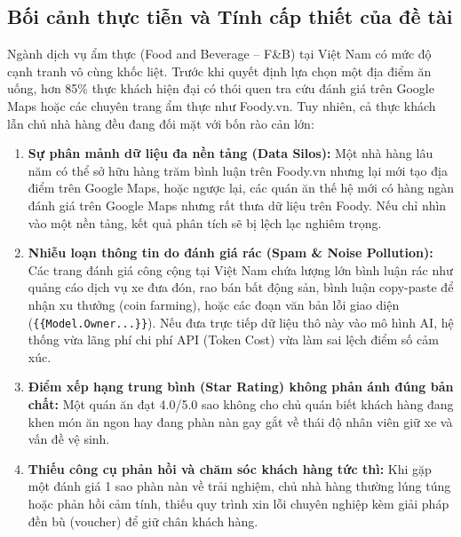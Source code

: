 \documentclass[12pt, a4paper]{article}
\begin{document}
\subsection{Bối cảnh thực tiễn và Tính cấp thiết của đề tài}
Ngành dịch vụ ẩm thực (Food and Beverage -- F\&B) tại Việt Nam có mức độ cạnh tranh vô cùng khốc liệt. Trước khi quyết định lựa chọn một địa điểm ăn uống, hơn 85\% thực khách hiện đại có thói quen tra cứu đánh giá trên Google Maps hoặc các chuyên trang ẩm thực như Foody.vn. Tuy nhiên, cả thực khách lẫn chủ nhà hàng đều đang đối mặt với bốn rào cản lớn:
\begin{enumerate}[leftmargin=1.2cm]
    \item \textbf{Sự phân mảnh dữ liệu đa nền tảng (Data Silos):} Một nhà hàng lâu năm có thể sở hữu hàng trăm bình luận trên Foody.vn nhưng lại mới tạo địa điểm trên Google Maps, hoặc ngược lại, các quán ăn thế hệ mới có hàng ngàn đánh giá trên Google Maps nhưng rất thưa dữ liệu trên Foody. Nếu chỉ nhìn vào một nền tảng, kết quả phân tích sẽ bị lệch lạc nghiêm trọng.
    \item \textbf{Nhiễu loạn thông tin do đánh giá rác (Spam \& Noise Pollution):} Các trang đánh giá công cộng tại Việt Nam chứa lượng lớn bình luận rác như quảng cáo dịch vụ xe đưa đón, rao bán bất động sản, bình luận copy-paste để nhận xu thưởng (coin farming), hoặc các đoạn văn bản lỗi giao diện (\texttt{\{\{Model.Owner...\}\}}). Nếu đưa trực tiếp dữ liệu thô này vào mô hình AI, hệ thống vừa lãng phí chi phí API (Token Cost) vừa làm sai lệch điểm số cảm xúc.
    \item \textbf{Điểm xếp hạng trung bình (Star Rating) không phản ánh đúng bản chất:} Một quán ăn đạt 4.0/5.0 sao không cho chủ quán biết khách hàng đang khen món ăn ngon hay đang phàn nàn gay gắt về thái độ nhân viên giữ xe và vấn đề vệ sinh.
    \item \textbf{Thiếu công cụ phản hồi và chăm sóc khách hàng tức thì:} Khi gặp một đánh giá 1 sao phàn nàn về trải nghiệm, chủ nhà hàng thường lúng túng hoặc phản hồi cảm tính, thiếu quy trình xin lỗi chuyên nghiệp kèm giải pháp đền bù (voucher) để giữ chân khách hàng.
\end{enumerate}
\end{document}
